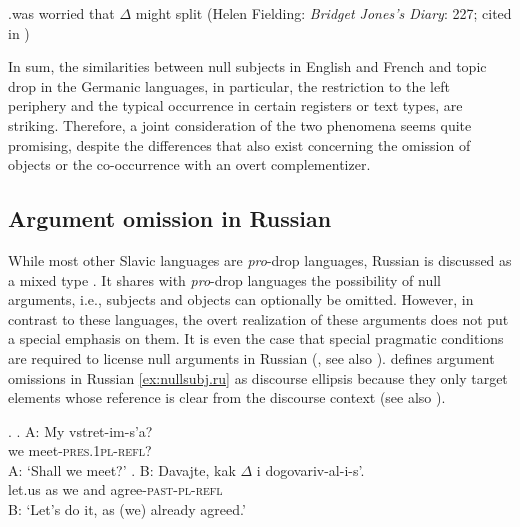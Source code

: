 \ex.\label{ex:nullsubj.emb.ov}was worried that $\Delta$ might split (Helen Fielding: \textit{Bridget Jones's Diary}: 227; cited in \cite[128]{haegeman.ihsane1999})

In sum, the similarities between null subjects in English and French and topic drop in the Germanic languages, in particular, the restriction to the left periphery and the typical occurrence in certain registers or text types, are striking. 
Therefore, a joint consideration of the two phenomena seems quite promising, despite the differences that also exist concerning the omission of objects or the co-occurrence with an overt complementizer. 

\subsection{Argument omission in Russian}
 
While most other Slavic languages are \textit{pro}-drop  languages, Russian  is discussed as a mixed type \citep[300--301]{franks1995}.
It shares with \textit{pro}-drop  languages the possibility of null arguments, i.e., subjects and objects can optionally be omitted.
However, in contrast to these languages, the overt realization of these arguments does not put a special emphasis on them. 
It is even the case that special pragmatic conditions are required to license null arguments in Russian  (\cite[188--189]{gordishevsky.avrutin2004}, see also \cite[300--301]{franks1995}).
\citet[307--308]{franks1995} defines argument omissions in Russian  \ref{ex:nullsubj.ru} as discourse ellipsis because they only target elements whose reference is clear from the discourse context (see also \cite[120--121]{zdorenko2010}).

\ex. \label{ex:nullsubj.ru}
\ag. A: My	vstret-im-s’a?\\
{} we 	meet-\textsc{pres}.\textsc{1pl}-\textsc{refl}?\\ 
A: `Shall we meet?'
\bg. B: Davajte,  kak $\Delta$ i dogovariv-al-i-s’.\\ 
{} let.us 	as we and agree-\textsc{past}-\textsc{pl}-\textsc{refl}\\
B: `Let’s do it, as (we) already agreed.' \citep[120]{zdorenko2010}

